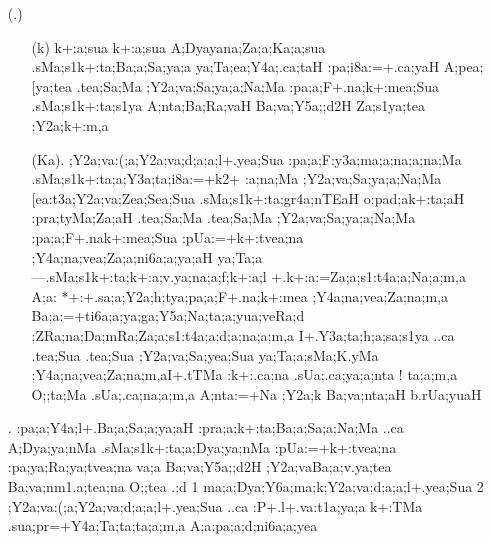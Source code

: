 \begin{spacing}{1.15}
\begin{itemize}
\item[({\sktf 14}.)]
\begin{itemize}
    \item[({\sktf k})] {\sktf k+:a;sua k+:a;sua {A;Dya}{ya}{na};Za;a;Ka;a;sua}
{\sktf .sMa;s1k+:ta;Ba;a;Sa;ya;a ya;Ta;ea;Y4a;.ca;taH
:pa;i8a:=+.ca;yaH A;pea;[ya;tea .tea;Sa;Ma ;Y2a;va;Sa;ya;a;Na;Ma :pa;a;F+.na;k+:mea;Sua
.sMa;s1k+:ta;s1ya A;nta;Ba;Ra;vaH
Ba;va;Y5a;;d2H Za;s1ya;tea ;Y2a;k+:m,a}
                
    \item[({\sktf Ka}).]
{\sktf ;Y2a;va:(;a;Y2a;va;d;a;a;l+.yea;Sua
:pa;a;F:y3a;ma;a;na;a;na;Ma .sMa;s1k+:ta;a;Y3a;ta;i8a:=+k2+%
:a;na;Ma ;Y2a;va;Sa;ya;a;Na;Ma [ea:t3a;Y2a;va;Zea;Sea;Sua
.sMa;s1k+:ta;gr4a{;nTEaH} {o}{:pa}{d;a}{k+:ta;aH}
{:pra};tyMa;Za;aH .tea;Sa;Ma .tea;Sa;Ma ;Y2a;va;Sa;ya;a;Na;Ma
:pa;a;F+.na\ZF{-}k+:mea;Sua :pUa:=+k+:tvea;na
;Y4a;na;vea;Za;a;ni6a;a;ya;aH\ZF{,} ya;Ta;a}{\rm---}{\sktf .sMa;s1k+:ta;k+:a;v.ya;na;a;f;k+:a;l%
+.k+:a:=\ZF{-}Za;a;s1:t4a;a;Na;a;m,a A;a:%
*+:+.sa;a;Y2a;h;tya;pa;a;F+.na;k+:mea
;Y4a;na;vea;Za;na;m,a\ZF{,} Ba;a:=+ti6a;a;ya;ga;Y5a;Na;ta;a;yua{;veRa};d%
;ZRa;na;Da;mRa;Za;a;s1:t4a;a;d;a;na;a;m,a\break
I+.Y3a;ta;h;a;sa;s1ya ..ca .tea;Sua .tea;Sua ;Y2a;va;Sa;yea;Sua
ya;Ta;a;sMa;K.yMa ;Y4a;na;vea;Za;na;m,a\ZF{---}I+.tTMa :k+:.ca;na
.sUa;.ca;ya;a;nta} ! {\sktf ta;a;m,a O;;ta;Ma .sUa;.ca;na;a;m,a A;nta:=+Na
;Y2a;k Ba;va;nta;aH b.rUa;yuaH}
     \end{itemize}
              
 \item[{\sktf 15}.]  
{\sktf :pa;a;Y4a;l+.Ba;a;Sa;a;ya;aH :pra;a;k+:ta;Ba;a;Sa;a;Na;Ma ..ca A;Dya;ya;nMa .sMa;s1k+:ta;a;Dya;ya;nMa :pUa:=+k+:tvea;na :pa;ya;Ra;ya;tvea;na va;a
Ba;va;Y5a;;d2H ;Y2a;vaBa;a;v.ya;tea Ba;va;nm1.a;tea;na O;;tea .;d
\ZF{(}1\ZF{)} ma;a;Dya;Y6a;ma;k\ZF{-};Y2a;va;d;a;a;l+.yea;Sua
\ZF{(}2\ZF{)} ;Y2a;va:(;a;Y2a;va;d;a;a;l+.yea;Sua ..ca
:P+.l+.va:t1a;ya;a k+:TMa .sua;pr=+Y4a;Ta;ta{;ta;a;m,a} A;a{:pa;a};d;ni6a;a;yea} 
 

\end{itemize}
\end{spacing}
